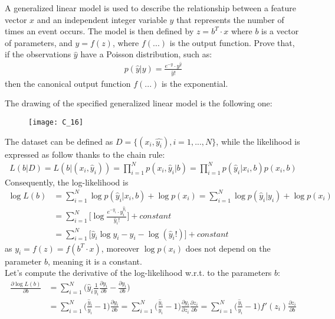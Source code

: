 \Exercise[number={16}]
A generalized linear model is used to describe the relationship between a
feature vector \(x\) and an independent integer variable \(y\) that represents
the number of times an event occurs. The model is then defined by
\(z=b^T\cdot x\) where \(b\) is a vector of parameters, and \(y=f(z)\),
where \(f(...)\) is the output function. Prove that, if the observations
\(\hat{y}\) have a Poisson distribution, such as:
\begin{align*}
    p(\hat{y}|y)=\frac{e^{-y}\cdot y^{\hat{y}}}{\hat{y}!}
\end{align*}
then the canonical output function \(f(...)\) is the exponential.

\Answer[number={16}]
The drawing of the specified generalized linear model is the following one:
\begin{figure}[H]
    \texttt{[image: C\_16]}
    \centering
\end{figure}
The dataset can be defined as \(D=\{(x_i, \hat{y_i}), i=1,...,N\}\), while
the likelihood is expressed as follow thanks to the chain rule:
\begin{align*}
    L(b|D)=L(b|(x_i, \hat{y}_i))
    =\prod_{i=1}^{N}p(x_i, \hat{y}_i|b)
    =\prod_{i=1}^{N}p(\hat{y}_i|x_i,b)p(x_i,b)
\end{align*}
Consequently, the log-likelihood is
\begin{align*}
    \log{L(b)}
    &=\sum_{i=1}^{N}\log{p(\hat{y}_i|x_i,b)}+\log{p(x_i)}
    =\sum_{i=1}^{N}\log{p(\hat{y}_i|y_i)}+\log{p(x_i)}\\
    &=\sum_{i=1}^{N}\biggl[\log{\frac{e^{-y_i}\cdot y_i^{\hat{y}_i}}{\hat{y}_i!}}\biggr]+constant\\
    &=\sum_{i=1}^{N}\biggl[\hat{y}_i\log{y_i}-y_i-\log{(\hat{y}_i!)}\biggr]+constant
\end{align*}
as \(y_i=f(z)=f(b^T\cdot x)\), moreover \(\log{p(x_i)}\) does not depend on
the parameter \(b\), meaning it is a constant.\\
Let's compute the derivative of the log-likelihood w.r.t. to the parameters
\(b\):
\begin{align*}
    \frac{\partial{\log{L(b)}}}{\partial{b}}
    &=\sum_{i=1}^{N}\biggl(\hat{y}_i\frac{1}{y_i}\frac{\partial{y_i}}{\partial{b}}-\frac{\partial{y_i}}{\partial{b}}\biggr)\\
    &=\sum_{i=1}^{N}\biggl(\frac{\hat{y}_i}{y_i}-1\biggr)\frac{\partial{y_i}}{\partial{b}}
    =\sum_{i=1}^{N}\biggl(\frac{\hat{y}_i}{y_i}-1\biggr)\frac{\partial{y_i}}{\partial{z_i}}\frac{\partial{z_i}}{\partial{b}}
    =\sum_{i=1}^{N}\biggl(\frac{\hat{y}_i}{y_i}-1\biggr)f'(z_i)\frac{\partial{z_i}}{\partial{b}}
\end{align*}
